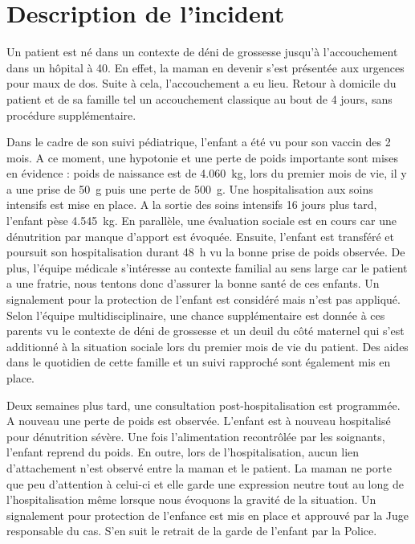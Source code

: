 \section{Description de l'incident}

Un patient est né dans un contexte de déni de grossesse jusqu’à l’accouchement dans un hôpital à \qty{40}{\SA}. En effet, la maman en devenir s’est présentée aux urgences pour maux de dos. Suite à cela, l’accouchement a eu lieu. Retour à domicile du patient et de sa famille tel un accouchement classique au bout de 4 jours, sans procédure supplémentaire.

Dans le cadre de son suivi pédiatrique, l’enfant a été vu pour son vaccin des 2 mois. A ce moment, une hypotonie et une perte de poids importante sont mises en évidence : poids de naissance est de \qty{4.060}{\kg}, lors du premier mois de vie, il y a une prise de \qty{50}{\g} puis une perte de \qty{500}{\g}. Une hospitalisation aux soins intensifs est mise en place. A la sortie des soins intensifs 16 jours plus tard, l’enfant pèse \qty{4.545}{\kg}. En parallèle, une évaluation sociale est en cours car une dénutrition par manque d’apport est évoquée. Ensuite, l’enfant est transféré et poursuit son hospitalisation durant \qty{48}{\hour} vu la bonne prise de poids observée. De plus, l’équipe médicale s’intéresse au contexte familial au sens large car le patient a une fratrie, nous tentons donc d’assurer la bonne santé de ces enfants. Un signalement pour la protection de l’enfant est considéré mais n’est pas appliqué. Selon l’équipe multidisciplinaire, une chance supplémentaire est donnée à ces parents vu le contexte de déni de grossesse et un deuil du côté maternel qui s’est additionné à la situation sociale lors du premier mois de vie du patient. Des aides dans le quotidien de cette famille et un suivi rapproché sont également mis en place.

Deux semaines plus tard, une consultation post-hospitalisation est programmée. A nouveau une perte de poids est observée. L’enfant est à nouveau hospitalisé pour dénutrition sévère. Une fois l’alimentation recontrôlée par les soignants, l’enfant reprend du poids. En outre, lors de l’hospitalisation, aucun lien d’attachement n’est observé entre la maman et le patient. La maman ne porte que peu d’attention à celui-ci et elle garde une expression neutre tout au long de l’hospitalisation même lorsque nous évoquons la gravité de la situation. Un signalement pour protection de l’enfance est mis en place et approuvé par la Juge responsable du cas. S’en suit le retrait de la garde de l’enfant par la Police.

